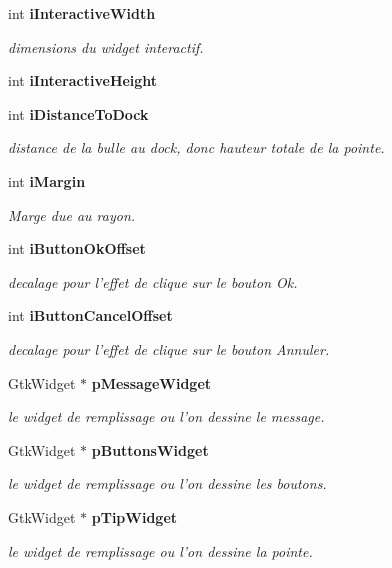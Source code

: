 \begin{CompactItemize}
int {\bf iInteractiveWidth}
\begin{CompactList}\small\item\em dimensions du widget interactif. \item\end{CompactList}\item 
int {\bf iInteractiveHeight}
\item 
int {\bf iDistanceToDock}
\begin{CompactList}\small\item\em distance de la bulle au dock, donc hauteur totale de la pointe. \item\end{CompactList}\item 
int {\bf iMargin}
\begin{CompactList}\small\item\em Marge due au rayon. \item\end{CompactList}\item 
int {\bf iButtonOkOffset}
\begin{CompactList}\small\item\em decalage pour l'effet de clique sur le bouton Ok. \item\end{CompactList}\item 
int {\bf iButtonCancelOffset}
\begin{CompactList}\small\item\em decalage pour l'effet de clique sur le bouton Annuler. \item\end{CompactList}\item 
GtkWidget $\ast$ {\bf pMessageWidget}
\begin{CompactList}\small\item\em le widget de remplissage ou l'on dessine le message. \item\end{CompactList}\item 
GtkWidget $\ast$ {\bf pButtonsWidget}
\begin{CompactList}\small\item\em le widget de remplissage ou l'on dessine les boutons. \item\end{CompactList}\item 
GtkWidget $\ast$ {\bf pTipWidget}
\begin{CompactList}\small\item\em le widget de remplissage ou l'on dessine la pointe. \item\end{CompactList}\item 

\end{CompactItemize}
